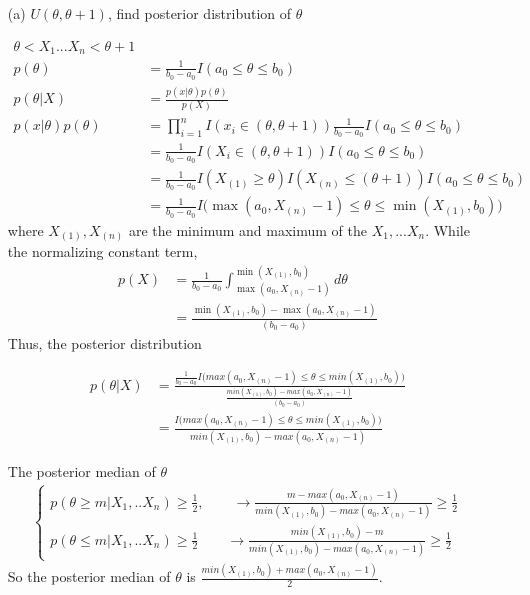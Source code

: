 \begin{itemize}
	\item [(a)] $U(\theta,\theta+1)$, find posterior distribution of $\theta$
	
	\begin{align*}
		\theta < X_1 ... X_n < \theta + 1 \\
		p(\theta) &= \frac{1}{ b_0 - a_0} I(a_0 \leq \theta \leq b_0)\\
		p(\theta |X) &= \frac{p(x|\theta) p(\theta)}{p(X)} \\
		p(x|\theta) p(\theta) &= \prod_{i=1}^n I(x_i \in (\theta, \theta + 1)) \frac{1}{ b_0 - a_0} I(a_0 \leq \theta \leq b_0)\\
		&= \frac{1}{ b_0 - a_0} I(X_{i} \in (\theta, \theta + 1)) I(a_0 \leq \theta \leq b_0)\\
		&=  \frac{1}{ b_0 - a_0}  I(X_{(1)} \geq \theta) I ( X_{(n)}  \leq (\theta + 1)) I(a_0 \leq \theta \leq b_0)\\
		&= \frac{1}{ b_0 - a_0}  I \Big( \max(a_0, X_{(n)}-1) \leq \theta \leq \min(X_{(1)}, b_0) \Big)
	\end{align*}
	where $X_{(1)}, X_{(n)}$ are the minimum and maximum of the $X_1, ... X_n$. 
	While the normalizing constant term,
	\begin{align*}
		p(X) &= \frac{1}{ b_0 - a_0} \int_{\max(a_0, X_{(n)}-1) } ^{\min(X_{(1)}, b_0)}  d\theta\\
		&=  \frac{\min(X_{(1)}, b_0) -\max(a_0, X_{(n)}-1) }{ (b_0 - a_0)} 
	\end{align*}	
Thus, the posterior distribution 

	\begin{align*}
	p(\theta|X) &= \frac{\frac{1}{ b_0 - a_0}  I \Big( max(a_0, X_{(n)}-1) \leq \theta \leq min(X_{(1)}, b_0) \Big)}{\frac{min(X_{(1)}, b_0) -max(a_0, X_{(n)}-1) }{ (b_0 - a_0)}} \\
	&= \frac{ I \Big( max(a_0, X_{(n)}-1) \leq \theta \leq min(X_{(1)}, b_0) \Big)}{min(X_{(1)}, b_0) -max(a_0, X_{(n)}-1)}
\end{align*}	

	The posterior median of $\theta$
\begin{align*}
	\begin{cases*}
		p(\theta \geq m|X_1, ..X_n)  \geq \frac{1}{2}, \qquad \rightarrow  \frac{m - max(a_0, X_{(n)}-1)}{min(X_{(1)}, b_0) -max(a_0, X_{(n)}-1)} \geq \frac{1}{2} \\
		p(\theta \leq m|X_1, ..X_n)  \geq \frac{1}{2} \qquad  \rightarrow \frac{min(X_{(1)}, b_0)- m }{min(X_{(1)}, b_0) -max(a_0, X_{(n)}-1)} \geq \frac{1}{2}
	\end{cases*}
\end{align*}	
	So the posterior median of $\theta$ is $\frac{min(X_{(1)}, b_0) + max(a_0, X_{(n)}-1)}{2} $.
	

\end{itemize}
